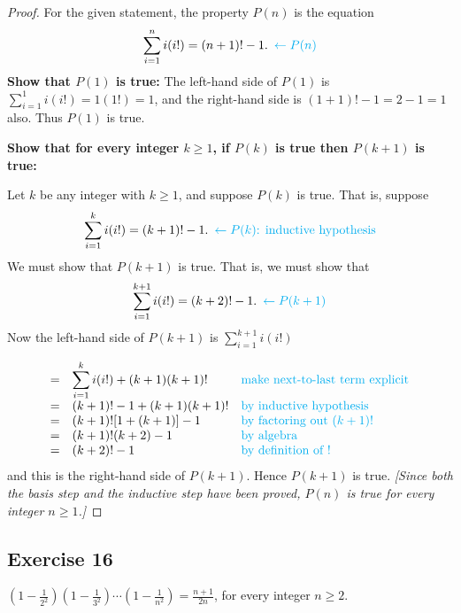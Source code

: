 \documentclass[14pt]{extarticle}
\newcommand{\dps}{\displaystyle}
\newcommand{\from}{\leftarrow}
\newcommand{\cy}{\color{cyan}}
\begin{document}
\begin{proof}
For the given statement, the property $P(n)$ is the equation
\[
\dps \sum_{i=1}^{n}i(i!) = (n+1)! - 1. \,\,\, {\cy \from P(n)}
\]
{\bf Show that $P(1)$ is true:} The left-hand side of $P(1)$ is $\dps \sum_{i=1}^{1}i(i!) = 1(1!) = 1$, and the right-hand side is $(1+1)! - 1 = 2 - 1 = 1$ also. Thus $P(1)$ is true.

{\bf Show that for every integer $k \geq 1$, if $P(k)$ is true then $P(k + 1)$ is true:}

Let $k$ be any integer with $k \geq 1$, and suppose $P(k)$ is true. That is, suppose
\[
\dps \sum_{i=1}^{k}i(i!) = (k+1)! - 1. \,\,\, {\cy \from P(k) \text{: inductive hypothesis}}
\]
We must show that $P(k + 1)$ is true. That is, we must show that
\[
\dps \sum_{i=1}^{k+1}i(i!) = (k+2)! - 1. \,\,\,{\cy \from P(k+1)}
\]
Now the left-hand side of $P(k + 1)$ is $\dps \sum_{i=1}^{k+1}i(i!)$

\[
\begin{array}{lll}
= & \dps \sum_{i=1}^{k}i(i!) + (k+1)(k+1)! & \text{\cy make next-to-last term explicit} \\
= & (k+1)! - 1 + (k+1)(k+1)! & \text{\cy by inductive hypothesis} \\
= & (k+1)![1 + (k+1)] - 1 & \text{\cy by factoring out $(k+1)!$} \\
= & (k+1)!(k+2) - 1 & \text{\cy by algebra} \\
= & (k+2)! - 1 & \text{\cy by definition of !}
\end{array}
\]
and this is the right-hand side of $P(k + 1)$. Hence $P(k + 1)$ is true. {\it [Since both the basis step and the inductive step have been proved, $P(n)$ is true for every integer $n \geq 1$.]}
\end{proof}

\subsection{Exercise 16}
$\dps \left(1 - \frac{1}{2^2}\right)\left(1 - \frac{1}{3^2}\right) \cdots \left(1 - \frac{1}{n^2}\right) = \frac{n+1}{2n}$, for every integer $n \geq 2$.
\end{document}
